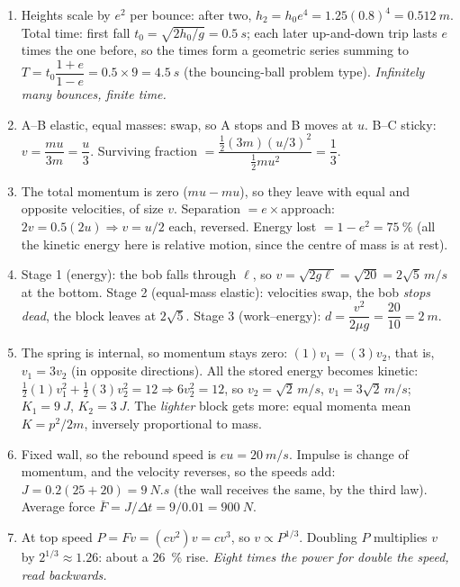 \begin{enumerate}[label=\textbf{\arabic*.},itemsep=5pt]
\item Heights scale by $e^2$ per bounce: after two, $h_2=h_0e^4=1.25(0.8)^4=\SI{0.512}{m}$. Total time:
first fall $t_0=\sqrt{2h_0/g}=\SI{0.5}{s}$; each later up-and-down trip lasts $e$ times the one before,
so the times form a geometric series summing to $T=t_0\dfrac{1+e}{1-e}=0.5\times9=\SI{4.5}{s}$ (the
bouncing-ball problem type). \emph{Infinitely many bounces, finite time.}

\item A--B elastic, equal masses: swap, so A stops and B moves at $u$. B--C sticky:
$v=\dfrac{mu}{3m}=\dfrac u3$. Surviving fraction $=\dfrac{\tfrac12(3m)(u/3)^2}{\tfrac12mu^2}=\dfrac13$.

\item The total momentum is zero ($mu-mu$), so they leave with equal and opposite velocities, of size
$v$. Separation
$=e\times$approach: $2v=0.5(2u)\Rightarrow v=u/2$ each, reversed. Energy lost
$=1-e^2=\SI{75}{\percent}$ (all the kinetic energy here is relative motion, since the centre of mass is
at rest). 

\item Stage 1 (energy): the bob falls through $\ell$, so $v=\sqrt{2g\ell}=\sqrt{20}=2\sqrt5\,\si{m/s}$ at
the bottom. Stage 2 (equal-mass
elastic): velocities swap, the bob \emph{stops dead}, the block leaves at $2\sqrt5$. Stage 3
(work--energy): $d=\dfrac{v^2}{2\mu g}=\dfrac{20}{10}=\SI{2}{m}$. 

\item The spring is internal, so momentum stays zero: $(1)v_1=(3)v_2$, that is, $v_1=3v_2$ (in opposite
directions). All the stored energy becomes kinetic: $\tfrac12(1)v_1^2+\tfrac12(3)v_2^2=12\Rightarrow6v_2^2=12$, so
$v_2=\sqrt2\,\si{m/s}$, $v_1=3\sqrt2\,\si{m/s}$; $K_1=\SI{9}{J}$, $K_2=\SI{3}{J}$. The \emph{lighter} block gets more:
equal momenta mean $K=p^2/2m$, inversely proportional to mass. 

\item Fixed wall, so the rebound speed is $eu=\SI{20}{m/s}$. Impulse is change of momentum, and the
velocity reverses, so the speeds add: $J=0.2(25+20)=\SI{9}{N.s}$ (the wall receives the same, by the third
law). Average force $\bar F=J/\Delta t=9/0.01=\SI{900}{N}$.

\item At top speed $P=Fv=(cv^2)v=cv^3$, so $v\propto P^{1/3}$. Doubling $P$ multiplies $v$ by
$2^{1/3}\approx1.26$: about a \SI{26}{\percent} rise. \emph{Eight times the power for double the
speed, read backwards.} 
\end{enumerate}

